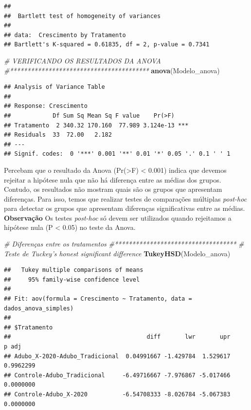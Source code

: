 \documentclass[
]{book}
\newenvironment{Shaded}{\begin{snugshade}}{\end{snugshade}}
\newcommand{\CommentTok}[1]{\textcolor[rgb]{0.56,0.35,0.01}{\textit{#1}}}
\newcommand{\KeywordTok}[1]{\textcolor[rgb]{0.13,0.29,0.53}{\textbf{#1}}}
\newcommand{\NormalTok}[1]{#1}
\begin{document}
\begin{verbatim}
## 
## 	Bartlett test of homogeneity of variances
## 
## data:  Crescimento by Tratamento
## Bartlett's K-squared = 0.61835, df = 2, p-value = 0.7341
\end{verbatim}

\begin{Shaded}
\begin{Highlighting}[]
\CommentTok{# VERIFICANDO OS RESULTADOS DA ANOVA}
\CommentTok{#****************************************}
\KeywordTok{anova}\NormalTok{(Modelo_anova)}
\end{Highlighting}
\end{Shaded}

\begin{verbatim}
## Analysis of Variance Table
## 
## Response: Crescimento
##            Df Sum Sq Mean Sq F value    Pr(>F)    
## Tratamento  2 340.32 170.160  77.989 3.124e-13 ***
## Residuals  33  72.00   2.182                      
## ---
## Signif. codes:  0 '***' 0.001 '**' 0.01 '*' 0.05 '.' 0.1 ' ' 1
\end{verbatim}

Percebam que o resultado da Anova (Pr(\textgreater F) \textless{} 0.001) indica que devemos rejeitar a hipótese nula que não há diferença entre as médias dos grupos. Contudo, os resultados não mostram quais são os grupos que apresentam diferenças. Para isso, temos que realizar testes de comparações múltiplas \emph{post-hoc} para detectar os grupos que apresentam diferenças significativas entre as médias. \textbf{Observação} Os testes \emph{post-hoc} só devem ser utilizados quando rejeitamos a hipótese nula (P \textless{} 0.05) no teste da Anova.

\begin{Shaded}
\begin{Highlighting}[]
\CommentTok{# Diferenças entre os tratamentos}
\CommentTok{#***********************************}
\CommentTok{# Teste de Tuckey's honest significant difference}
\KeywordTok{TukeyHSD}\NormalTok{(Modelo_anova)}
\end{Highlighting}
\end{Shaded}

\begin{verbatim}
##   Tukey multiple comparisons of means
##     95% family-wise confidence level
## 
## Fit: aov(formula = Crescimento ~ Tratamento, data = dados_anova_simples)
## 
## $Tratamento
##                                       diff       lwr       upr     p adj
## Adubo_X-2020-Adubo_Tradicional  0.04991667 -1.429784  1.529617 0.9962299
## Controle-Adubo_Tradicional     -6.49716667 -7.976867 -5.017466 0.0000000
## Controle-Adubo_X-2020          -6.54708333 -8.026784 -5.067383 0.0000000
\end{verbatim}
\end{document}
